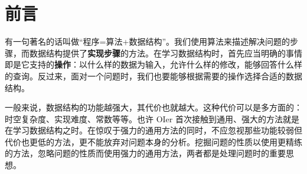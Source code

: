 \chapter*{前言}

有一句著名的话叫做“程序=算法+数据结构”。我们使用算法来描述解决问题的步骤，而数据结构提供了\textbf{实现步骤}的方法。在学习数据结构时，首先应当明确的事情即是它支持的\textbf{操作}：以什么样的数据为输入，允许什么样的修改，能够回答什么样的查询。反过来，面对一个问题时，我们也要能够根据需要的操作选择合适的数据结构。

一般来说，数据结构的功能越强大，其代价也就越大。这种代价可以是多方面的：时空复杂度、实现难度、常数等等。也许 OIer 首次接触到通用、强大的方法就是在学习数据结构之时。在惊叹于强力的通用方法的同时，不应忽视那些功能较弱但代价也更低的方法，更不能放弃对问题本身的分析。挖掘问题的性质以使用更精练的方法，忽略问题的性质而使用强力的通用方法，两者都是处理问题时的重要思想。